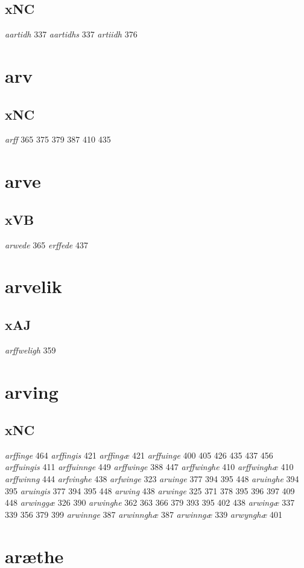 \documentclass[a4paper,twocolumn]{article}
\begin{document}
\subsection{xNC}
\label{sec:orgc3174ae}
\emph{aartidh} 337 \emph{aartidhs} 337 \emph{artiidh} 376 
\section{arv}
\label{sec:orga4af633}
\subsection{xNC}
\label{sec:org0bb3153}
\emph{arff} 365 375 379 387 410 435 
\section{arve}
\label{sec:orgb1f0f48}
\subsection{xVB}
\label{sec:org0bb85ca}
\emph{arwede} 365 \emph{erffede} 437 
\section{arvelik}
\label{sec:org31ff1b3}
\subsection{xAJ}
\label{sec:org8ca2c39}
\emph{arffweligh} 359 
\section{arving}
\label{sec:orgc688cd9}
\subsection{xNC}
\label{sec:org2456538}
\emph{arffinge} 464 \emph{arffingis} 421 \emph{arffingæ} 421 \emph{arffuinge} 400 405 426 435 437 456 \emph{arffuingis} 411 \emph{arffuinnge} 449 \emph{arffwinge} 388 447 \emph{arffwinghe} 410 \emph{arffwinghæ} 410 \emph{arffwinng} 444 \emph{arfvinghe} 438 \emph{arfwinge} 323 \emph{aruinge} 377 394 395 448 \emph{aruinghe} 394 395 \emph{aruingis} 377 394 395 448 \emph{arwing} 438 \emph{arwinge} 325 371 378 395 396 397 409 448 \emph{arwinggæ} 326 390 \emph{arwinghe} 362 363 366 379 393 395 402 438 \emph{arwingæ} 337 339 356 379 399 \emph{arwinnge} 387 \emph{arwinnghæ} 387 \emph{arwinngæ} 339 \emph{arwynghæ} 401 
\section{aræthe}
\label{sec:org67847e3}
\end{document}

